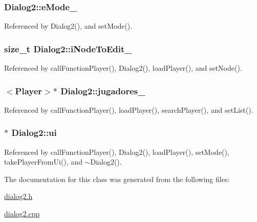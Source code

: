 \subsubsection[{e\+Mode\+\_\+}]{ Dialog2\+::e\+Mode\+\_\+\hspace{0.3cm}{\ttfamily [private]}}\label{class_dialog2_a30d760908a70fc65c73499b96c177d46}


Referenced by Dialog2(), and set\+Mode().

\hypertarget{class_dialog2_a8fb4a8ae79e9aa259a175b61bef0a977}{}
\subsubsection[{i\+Node\+To\+Edit\+\_\+}]{\setlength{\rightskip}{0pt plus 5cm}size\+\_\+t Dialog2\+::i\+Node\+To\+Edit\+\_\+\hspace{0.3cm}{\ttfamily [private]}}\label{class_dialog2_a8fb4a8ae79e9aa259a175b61bef0a977}


Referenced by call\+Function\+Player(), Dialog2(), load\+Player(), and set\+Node().

\hypertarget{class_dialog2_a1727e93199b6480451889b6522c626a2}{}
\subsubsection[{jugadores\+\_\+}]{$<${\bf Player}$>$$\ast$ Dialog2\+::jugadores\+\_\+\hspace{0.3cm}{\ttfamily [private]}}\label{class_dialog2_a1727e93199b6480451889b6522c626a2}


Referenced by call\+Function\+Player(), load\+Player(), search\+Player(), and set\+List().

\hypertarget{class_dialog2_a321aadfcfc152fc97dc63391f08216fa}{}
\subsubsection[{ui}]{$\ast$ Dialog2\+::ui\hspace{0.3cm}{\ttfamily [private]}}\label{class_dialog2_a321aadfcfc152fc97dc63391f08216fa}


Referenced by call\+Function\+Player(), Dialog2(), load\+Player(), set\+Mode(), take\+Player\+From\+Ui(), and $\sim$\+Dialog2().



The documentation for this class was generated from the following files\+:\begin{DoxyCompactItemize}
\item 
\hyperlink{dialog2_8h}{dialog2.\+h}\item 
\hyperlink{dialog2_8cpp}{dialog2.\+cpp}\end{DoxyCompactItemize}
